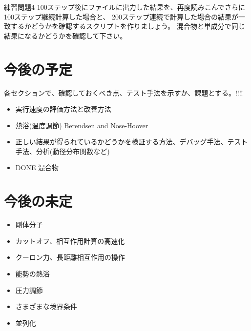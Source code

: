 \documentclass[a4,10pt]{article}
\begin{document}
\begin{itembox}[l]{練習問題4}
100ステップ後にファイルに出力した結果を、再度読みこんでさらに100ステップ継続計算した場合と、
    200ステップ連続で計算した場合の結果が一致するかどうかを確認するスクリプトを作りましょう。	混合物と単成分で同じ結果になるかどうかを確認して下さい。
    \end{itembox}



\section{今後の予定}

各セクションで、確認しておくべき点、テスト手法を示すか、課題とする。!!!!

\begin{itemize}
\item 実行速度の評価方法と改善方法
\item 熱浴(温度調節) Berendsen and Nose-Hoover
\item 正しい結果が得られているかどうかを検証する方法、デバッグ手法、テスト手法、分析(動径分布関数など)
\item DONE 混合物
\end{itemize}
\section{今後の未定}
\begin{itemize}
\item 剛体分子
\item カットオフ、相互作用計算の高速化
\item クーロン力、長距離相互作用の操作
\item 能勢の熱浴
\item 圧力調節
\item さまざまな境界条件
\item 並列化
\end{itemize}
\end{document}
